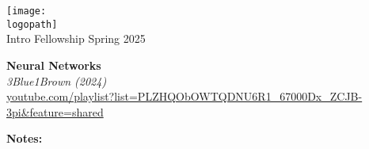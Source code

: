 \documentclass[12pt]{article}
\def\logopath{../assets/caiac_logo.png}  %
\def\programlongname{
    Intro Fellowship
}
\def\timeperiod{
    Spring 2025
}
\begin{document}
\thispagestyle{empty} %

\begin{center}
    \texttt{[image: \\logopath]}\\
    \vspace{0.2em}
    {\color{primaryFaded}\programlongname\color{primaryFaded}\timeperiod}
\end{center}

\vspace{1em}

% 
% 
\noindent\textbf{ Neural Networks }\\
\textit{ 3Blue1Brown (2024) }\\
{\small \url{ youtube.com/playlist?list=PLZHQObOWTQDNU6R1_67000Dx_ZCJB-3pi&feature=shared }}

\vspace{1em}
% 
% 
\textbf{Notes:}
% 
\end{document}
